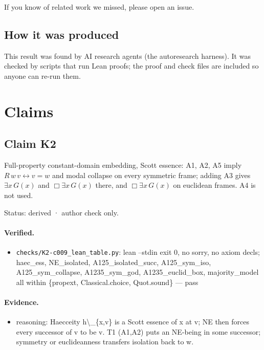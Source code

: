 \documentclass{article}
\begin{document}
If you know of related work we missed, please open an issue.

\subsection*{How it was produced}

This result was found by AI research agents (the autoresearch harness). It was checked by scripts that run Lean proofs; the proof and check files are included so anyone can re-run them.

\section{Claims}

\subsection*{Claim K2}

Full-property constant-domain embedding, Scott essence: A1, A2, A5 imply $R\,w\,v \leftrightarrow v = w$ and modal collapse on every symmetric frame; adding A3 gives $\exists x\,G(x)$ and $\Box\exists x\,G(x)$ there, and $\Box\exists x\,G(x)$ on euclidean frames. A4 is not used.

Status: derived · author check only.

\paragraph{Verified.}
\begin{itemize}
\item \texttt{checks/K2-c009\_lean\_table.py}: lean --stdin exit 0, no sorry, no axiom decls; haec\_ess, NE\_isolated, A125\_isolated\_succ, A125\_sym\_iso, A125\_sym\_collapse, A1235\_sym\_god, A1235\_euclid\_box, majority\_model all within \{propext, Classical.choice, Quot.sound\} --- pass
\end{itemize}

\paragraph{Evidence.}
\begin{itemize}
\item reasoning: Haecceity h\textbackslash{}\_\{x,v\} is a Scott essence of x at v; NE then forces every successor of v to be v. T1 (A1,A2) puts an NE-being in some successor; symmetry or euclideanness transfers isolation back to w.
\end{itemize}
\end{document}
